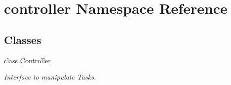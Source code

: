 \hypertarget{namespacecontroller}{
\section{controller \-Namespace \-Reference}
\label{namespacecontroller}
}
\subsection*{\-Classes}
\begin{DoxyCompactItemize}
\item 
class \hyperlink{classcontroller_1_1Controller}{\-Controller}
\begin{DoxyCompactList}\small\item\em \-Interface to manipulate \-Tasks. \end{DoxyCompactList}\end{DoxyCompactItemize}
